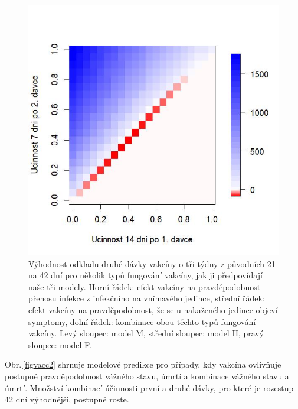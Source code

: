 \begin{figure}[h]
\begin{center}
\begin{minipage}[m]{0.3\linewidth}
		\end{minipage}
		\begin{minipage}[m]{0.3\linewidth}
			\includegraphics[width=\textwidth]{pic/SAM_DIFF_mean_T.jpg}
		\end{minipage}
	\end{center}
	\caption{Výhodnost odkladu druhé dávky vakcíny o tři týdny z původních 21 na 42 dní pro několik typů fungování vakcíny, jak ji předpovídají naše tři modely. Horní řádek: efekt vakcíny na pravděpodobnost přenosu infekce z infekčního na vnímavého jedince, střední řádek: efekt vakcíny na pravděpodobnost, že se u nakaženého jedince objeví symptomy, dolní řádek: kombinace obou těchto typů fungování vakcíny. Levý sloupec: model M, střední sloupec: model H, pravý sloupec: model F.}
	\label{figvacc1}
\end{figure}
 
Obr.\,\ref{figvacc2} shrnuje modelové predikce pro případy, kdy vakcína ovlivňuje postupně pravděpodobnost vážného stavu, úmrtí a kombinace vážného stavu a úmrtí. Množství kombinací účinnosti první a druhé dávky, pro které je rozestup 42 dní výhodnější, postupně roste.
 
